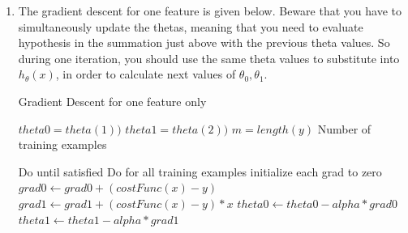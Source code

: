 \begin{enumerate}
 \item The gradient descent for one feature is given below. 
 Beware that you have to simultaneously update the thetas, 
 meaning that you need to evaluate hypothesis in the summation just above with the previous theta values. So during one iteration, you should use the same theta values to substitute into $h_\theta(x)$, in order to calculate next values of $\theta_0, \theta_1$.
  \begin{algorithm}
   \caption{Gradient Descent for one feature only}
    \begin{algorithmic}[1]
      

        \State $theta0 = theta(1))$  
        \State $theta1 = theta(2))$  
        \State $m = length(y)$ \Comment Number of training examples

         \Comment Do until satisfied
                     \Comment Do for all training examples
                         \State initialize each grad to zero
           	 	\State $grad0 \leftarrow grad0 + (costFunc(x) - y)$
		         \State $grad1 \leftarrow grad1 + (costFunc(x) - y) * x$
                    \EndFor
                    \State $theta0 \leftarrow theta0 - alpha * grad0$
                    \State $theta1 \leftarrow theta1 - alpha * grad1$
        \EndFor
       \EndFunction

\end{algorithmic}
\end{algorithm}


\end{enumerate}
